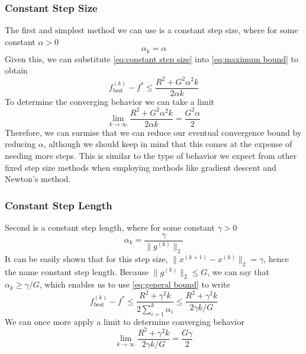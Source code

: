 \documentclass[journal,onecolumn]{IEEEtran}
\DeclareMathOperator{\best}{best}
\begin{document}
\subsubsection{Constant Step Size}\label{sec:constant step size}
The first and simplest method we can use is a constant step size, where for some constant \(\alpha > 0\)
\begin{equation}\label{eq:constant step size}
\alpha_{k} = \alpha
\end{equation}
Given this, we can substitute \eqref{eq:constant step size} into \eqref{eq:maximum bound} to obtain
\begin{equation}\label{eq:constant step size bound}
f^{(k)}_{\best}-f^* \leq \frac{R^2  + G^2 \alpha^2 k}{2\alpha k}
\end{equation}
To determine the converging behavior we can take a limit
\begin{equation}\label{eq:constant step size convergence}
\lim_{k \rightarrow \infty} \frac{R^2  + G^2 \alpha^2 k}{2\alpha k} = \frac{G^2 \alpha}{2}
\end{equation}
Therefore, we can surmise that we can reduce our eventual convergence bound by reducing \(\alpha\), although we should keep in mind that this comes at the expense of needing more steps. This is similar to the type of behavior we expect from other fixed step size methods when employing methods like gradient descent and Newton's method.

\subsubsection{Constant Step Length}\label{sec:constant step length}
Second is a constant step length, where for some constant \(\gamma > 0\)
\begin{equation}\label{eq:constant step length}
\alpha_k = \frac{\gamma}{\|g^{(k)}\|_2}
\end{equation}
It can be easily shown that for this step size, \(\|x^{(k+1)}-x^{(k)}\|_2 = \gamma\), hence the name constant step length. Because \(\|g^{(k)}\|_2 \leq G\), we can say that \(\alpha_k \geq \gamma/G\), which enables us to use \eqref{eq:general bound} to write
\begin{equation}\label{eq:constant step length bound}
f^{(k)}_{\best}-f^* \leq \frac{R^2  + \gamma^2 k}{2\sum^k_{i=1}\alpha_i} \leq \frac{R^2  + \gamma^2 k}{2\gamma k / G}
\end{equation}
We can once more apply a limit to determine converging behavior
\begin{equation}\label{eq:constant step length convergence}
\lim_{k \rightarrow \infty} \frac{R^2  + \gamma^2 k}{2\gamma k / G} = \frac{G \gamma}{2}
\end{equation}
\end{document}

